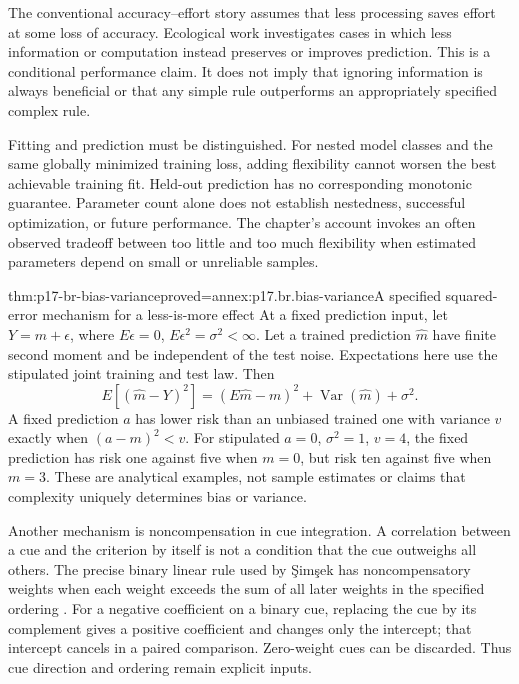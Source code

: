 The conventional accuracy--effort story assumes that less processing saves
effort at some loss of accuracy. Ecological work investigates cases in which
less information or computation instead preserves or improves prediction.
This is a conditional performance claim. It does not imply that ignoring
information is always beneficial or that any simple rule outperforms an
appropriately specified complex rule.

Fitting and prediction must be distinguished. For nested model classes and
the same globally minimized training loss, adding flexibility cannot worsen
the best achievable training fit. Held-out prediction has no corresponding
monotonic guarantee. Parameter count alone does not establish nestedness,
successful optimization, or future performance. The chapter's account
invokes an often observed tradeoff between too little and too much flexibility
when estimated parameters depend on small or unreliable samples.

\begin{hbtheorem}{thm:p17-br-bias-variance}{proved=annex:p17.br.bias-variance}{A specified squared-error mechanism for a less-is-more effect}
At a fixed prediction input, let \(Y=m+\epsilon\), where
\(E\epsilon=0\), \(E\epsilon^2=\sigma^2<\infty\). Let a trained
prediction \(\widehat m\) have finite second moment and be independent
of the test noise. Expectations here use the stipulated joint training
and test law. Then
\[
 E[(\widehat m-Y)^2]=(E\widehat m-m)^2+
                         \operatorname{Var}(\widehat m)+\sigma^2.
\]
A fixed prediction \(a\) has lower risk than an unbiased trained one
with variance \(v\) exactly when \((a-m)^2<v\).
For stipulated \(a=0\), \(\sigma^2=1\), \(v=4\), the fixed
prediction has risk one against five when \(m=0\), but risk ten
against five when \(m=3\). These are analytical examples, not sample
estimates or claims that complexity uniquely determines bias or variance.
\end{hbtheorem}

Another mechanism is noncompensation in cue integration. A correlation
between a cue and the criterion by itself is not a condition that the cue
outweighs all others. The precise binary linear rule used by Şimşek has
noncompensatory weights when each weight exceeds the sum of all later
weights in the specified ordering
\cite[§2.3]{Simsek2013LinearDecision}.
For a negative coefficient on a binary cue, replacing the cue by its
complement gives a positive coefficient and changes only the intercept;
that intercept cancels in a paired comparison. Zero-weight cues can be
discarded. Thus cue direction and ordering remain explicit inputs.

